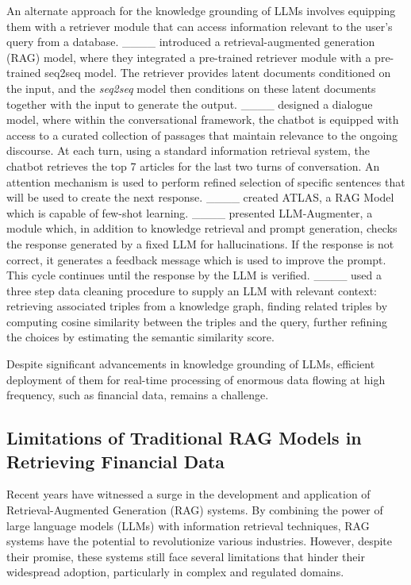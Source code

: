 An alternate approach for the knowledge grounding of LLMs involves equipping them with a retriever module that can access information relevant to the user's query from a database. ____ introduced a retrieval-augmented generation (RAG) model, where they integrated a pre-trained retriever module with a pre-trained seq2seq model. The retriever provides latent documents conditioned on the input, and the {\it seq2seq} model then conditions on these latent documents together with the input to generate the output. ____ designed a dialogue model, where within the conversational framework, the chatbot is equipped with access to a curated collection of passages that maintain relevance to the ongoing discourse. At each turn, using a standard information retrieval system, the chatbot retrieves the top 7 articles for the last two turns of conversation. An attention mechanism is used to perform refined selection of specific sentences that will be used to create the next response. 
____ created ATLAS, a RAG Model which is capable of few-shot learning.
____ presented LLM-Augmenter, a module which, in addition to knowledge retrieval and prompt generation, checks the response generated by a fixed LLM for hallucinations. If the response is not correct, it generates a feedback message which is used to improve the prompt. This cycle continues until the response by the LLM is verified. ____ used a three step data cleaning procedure to supply an LLM with relevant context: retrieving associated triples from a knowledge graph, finding related triples by computing cosine similarity between the triples and the query, further refining the choices by estimating the semantic similarity score. 

Despite significant advancements in knowledge grounding of LLMs, efficient deployment of them for real-time processing of enormous data flowing at high frequency, such as financial data, remains a challenge. 

\subsection{Limitations of Traditional RAG Models in Retrieving Financial Data}
Recent years have witnessed a surge in the development and application of Retrieval-Augmented Generation (RAG) systems. By combining the power of large language models (LLMs) with information retrieval techniques, RAG systems have the potential to revolutionize various industries. However, despite their promise, these systems still face several limitations that hinder their widespread adoption, particularly in complex and regulated domains. 

